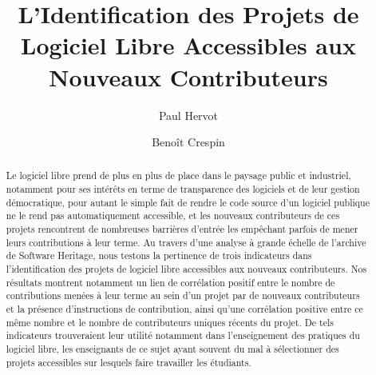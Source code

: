 \documentclass[dvipsnames]{llncs}
\title{L'Identification des Projets de Logiciel Libre Accessibles aux Nouveaux Contributeurs}
\author{%
    \todo[inline]{TODO: anonymiser les auteurs pour la soumission initiale}
    Paul Hervot\inst{1}%
    \and%
    Benoît Crespin\inst{2}\orcidID{0000-0002-9105-0243}%
}
\institute{EPITA}
\institute{EPITA \and Université de Limoge}
\begin{document}
    \maketitle

    \begin{abstract}
        Le logiciel libre prend de plus en plus de place dans le paysage public et industriel,
        notamment pour ses intérêts en terme de transparence des logiciels et de leur gestion
        démocratique, pour autant le simple fait de rendre le code source d'un logiciel publique ne le
        rend pas automatiquement accessible, et les nouveaux contributeurs de ces projets rencontrent
        de nombreuses barrières d'entrée les empêchant parfois de mener leurs contributions à leur
        terme. Au travers d'une analyse à grande échelle de l'archive de Software Heritage, nous
        testons la pertinence de trois indicateurs dans l'identification des projets de logiciel libre
        accessibles aux nouveaux contributeurs. Nos résultats montrent notamment un lien de
        corrélation positif entre le nombre de contributions menées à leur terme au sein d'un projet
        par de nouveaux contributeurs et la présence d'instructions de contribution, ainsi qu'une
        corrélation positive entre ce même nombre et le nombre de contributeurs uniques récents du
        projet. De tels indicateurs trouveraient leur utilité notamment dans l'enseignement des
        pratiques du logiciel libre, les enseignants de ce sujet ayant souvent du mal à sélectionner
        des projets accessibles sur lesquels faire travailler les étudiants.

    \end{abstract}
\end{document}

